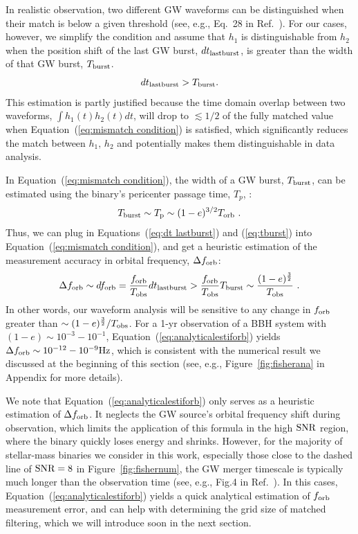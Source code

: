 \documentclass[%
 reprint,
 amsmath,amssymb,
 aps,
]{revtex4-2}
\begin{document}
In realistic observation, two different GW waveforms can be distinguished when their match is below a given threshold (see, e.g., Eq.~28 in Ref.~\citep{Xuan+21}). For our cases, however, we simplify the condition and assume that $h_1$ is distinguishable from $h_2$ when the position shift of the last GW burst, $d t_{\rm last burst}$, is greater than the width of that GW burst, $T_{\rm burst}$.
\begin{equation}
   d t_{\rm last burst}>T_{\rm burst}.\label{eq:mismatch condition}
\end{equation}
This estimation is partly justified because the time domain overlap between two waveforms, $\int h_1(t)h_2(t) dt$, will drop to $\lesssim 1/2$ of the fully matched value when Equation~(\ref{eq:mismatch condition}) is satisfied, which significantly reduces the match between $h_1,\, h_2$ and potentially makes them distinguishable in data analysis.

In Equation~(\ref{eq:mismatch condition}), the width of a GW burst, $T_{\rm burst}$, can be estimated using the binary's pericenter passage time, $T_p$, \citep[see, e.g.,][]{O'Leary+09}: 
\begin{equation}
   T_{\rm burst}\sim T_{\rm p} \sim  (1-e)^{3/2} T_{\rm orb} \ .
    \label{eq:tburst}
\end{equation}
Thus, we can plug in Equations~(\ref{eq:dt lastburst}) and (\ref{eq:tburst}) into Equation~(\ref{eq:mismatch condition}), and get a heuristic estimation of the measurement accuracy in orbital frequency, $\Delta f_{\rm orb}$:
\begin{equation}
   \Delta f_{\rm orb}\sim d f_{\rm orb}=\frac{f_{\rm orb}}{T_{\rm obs}}d t_{\rm last burst} > \frac{f_{\rm orb}}{T_{\rm obs}}T_{\rm burst} \sim \frac{(1-e)^{\frac{3}{2}}}{T_{\rm obs}} \ .\label{eq:analyticalestiforb}
\end{equation}
In other words, our waveform analysis will be sensitive to any change in $f_{\rm orb}$ greater than $\sim(1-e)^\frac{3}{2}/T_{\rm obs}$. For a 1-yr observation of a BBH system with $(1-e)\sim 10^{-3}-10^{-1}$, Equation~(\ref{eq:analyticalestiforb}) yields $\Delta f_{\rm orb}\sim 10^{-12}-10^{-9} \rm Hz$, which is consistent with the numerical result we discussed at the beginning of this section (see, e.g., Figure~\ref{fig:fisherana} in Appendix for more details).

We note that Equation~(\ref{eq:analyticalestiforb}) only serves as a heuristic estimation of $\Delta f_{\rm orb}$. It neglects the GW source's orbital frequency shift during observation, which limits the application of this formula in the high $\rm SNR$ region, where the binary quickly loses energy and shrinks. However, for the majority of stellar-mass binaries we consider in this work, especially those close to the dashed line of $\rm SNR=8$ in Figure~\ref{fig:fishernum}, the GW merger timescale is typically much longer than the observation time (see, e.g., Fig.4 in Ref.~\citep{Xuan+23b}). In this cases, Equation~(\ref{eq:analyticalestiforb}) yields a quick analytical estimation of $f_{\rm orb}$ measurement error, and can help with determining the grid size of matched filtering, which we will introduce soon in the next section.
\end{document}
